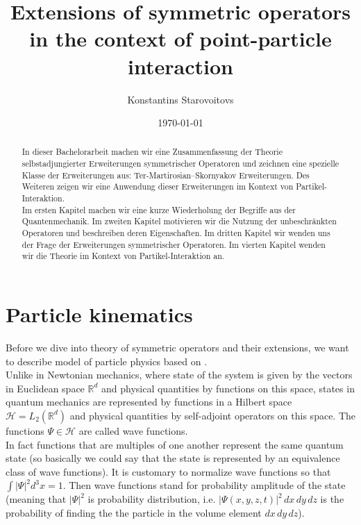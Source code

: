 \documentclass[11pt, a4paper, german]{article}
\author{Konstantins Starovoitovs}
\date{\today}
\title{Extensions of symmetric operators in the context of point-particle interaction}
\theoremstyle{plain}
\theoremstyle{definition}
\theoremstyle{remark}
\numberwithin{equation}{section}
\numberwithin{theorem}{section}
\begin{document}
\maketitle


\begin{abstract}
In dieser Bachelorarbeit machen wir eine Zusammenfassung der Theorie selbstadjungierter Erweiterungen symmetrischer Operatoren und zeichnen eine spezielle Klasse der Erweiterungen aus: Ter-Martirosian--Skornyakov Erweiterungen. Des Weiteren zeigen wir eine Anwendung dieser Erweiterungen im Kontext von Partikel-Interaktion.\\
Im ersten Kapitel machen wir eine kurze Wiederholung der Begriffe aus der Quantenmechanik. Im zweiten Kapitel motivieren wir die Nutzung der unbeschränkten Operatoren und beschreiben deren Eigenschaften. Im dritten Kapitel wir wenden uns der Frage der Erweiterungen symmetrischer Operatoren. Im vierten Kapitel wenden wir die Theorie im Kontext  von Partikel-Interaktion an.
\end{abstract}

\section{Particle kinematics}

Before we dive into theory of symmetric operators and their extensions, we want to describe model of particle physics based on \cite{griffiths}.\\

Unlike in Newtonian mechanics, where state of the system is given by the vectors in Euclidean space $\mathbb{R} ^d$ and physical quantities by functions on this space, states in quantum mechanics are represented by functions in a Hilbert space $\mathcal{H} = L_2(\mathbb{R} ^d)$ and physical quantities by self-adjoint operators on this space. The functions $\Psi \in \mathcal{H}$ are called wave functions.\\

In fact functions that are multiples of one another represent the same quantum state (so basically we could say that the state is represented by an equivalence class of wave functions). It is customary to normalize wave functions so that $\int |\Psi|^2 d^3x=1$. Then wave functions stand for probability amplitude of the state (meaning that $|\Psi |^2$ is probability distribution, i.e. $|\Psi(x,y,z,t)|^2 \, dx \, dy\,dz$ is the probability of finding the the particle in the volume element $dx\,dy\,dz$).\\
\end{document}

